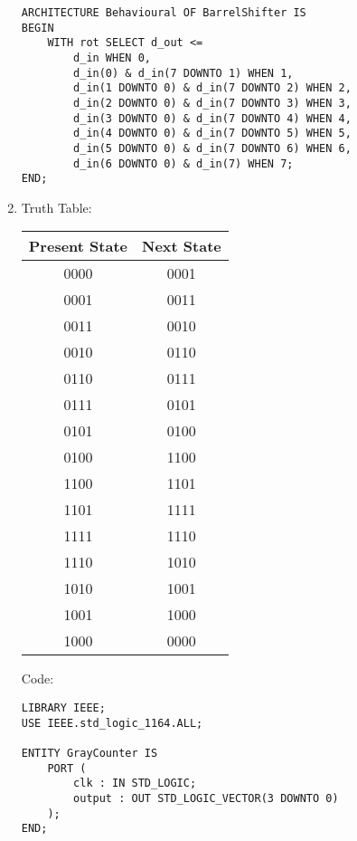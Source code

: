\documentclass{article}
\begin{document}
\begin{enumerate}
\begin{verbatim}
ARCHITECTURE Behavioural OF BarrelShifter IS
BEGIN
    WITH rot SELECT d_out <= 
        d_in WHEN 0, 
        d_in(0) & d_in(7 DOWNTO 1) WHEN 1, 
        d_in(1 DOWNTO 0) & d_in(7 DOWNTO 2) WHEN 2, 
        d_in(2 DOWNTO 0) & d_in(7 DOWNTO 3) WHEN 3, 
        d_in(3 DOWNTO 0) & d_in(7 DOWNTO 4) WHEN 4, 
        d_in(4 DOWNTO 0) & d_in(7 DOWNTO 5) WHEN 5, 
        d_in(5 DOWNTO 0) & d_in(7 DOWNTO 6) WHEN 6, 
        d_in(6 DOWNTO 0) & d_in(7) WHEN 7;
END;
     \end{verbatim}
     \item Truth Table:

     \begin{tabular} { c c}
         \toprule
         Present State & Next State \\
         \midrule
0000  & 0001 \\
0001  & 0011 \\
0011  & 0010 \\
0010  & 0110 \\
0110  & 0111 \\
0111  & 0101 \\
0101  & 0100 \\
0100  & 1100 \\
1100  & 1101 \\
1101  & 1111 \\
1111  & 1110 \\
1110  & 1010 \\
1010  & 1001 \\
1001  & 1000 \\
1000  & 0000 \\
         \bottomrule
      \end{tabular}
 
      Code:
 
      \begin{verbatim}
LIBRARY IEEE;
USE IEEE.std_logic_1164.ALL;

ENTITY GrayCounter IS
    PORT (
        clk : IN STD_LOGIC;
        output : OUT STD_LOGIC_VECTOR(3 DOWNTO 0)
    );
END;


\end{verbatim}
\end{enumerate}
\end{document}
